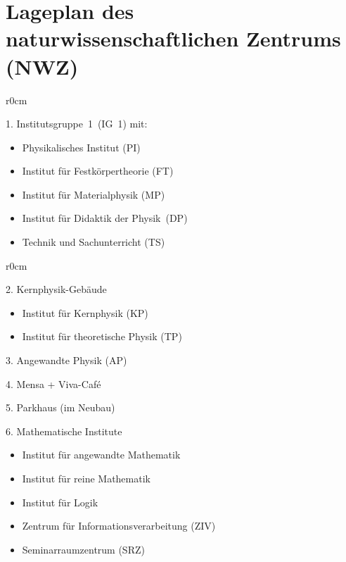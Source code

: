 
\section{Lageplan des naturwissenschaftlichen Zentrums (NWZ)}

\vspace{3\baselineskip}

{\large
\begin{wrapfigure}{r}{0cm}
	\centering
\end{wrapfigure}
1. Institutsgruppe~1~(IG~1) mit:
\begin{itemize}
	\item Physikalisches Institut (PI)
	\item Institut für Festkörpertheorie (FT)
	\item Institut für Materialphysik (MP)
	\item Institut für Didaktik der Physik~(DP)
	\item Technik und Sachunterricht (TS)
\end{itemize}

\clearpage
	
\begin{wrapfigure}{r}{0cm}
	\centering
\end{wrapfigure}
2. Kernphysik-Gebäude
\begin{itemize}
	\item Institut für Kernphysik (KP)
	\item Institut für theoretische Physik (TP)
\end{itemize}

3. Angewandte Physik (AP)

4. Mensa + Viva-Café

5. Parkhaus (im Neubau)

6. Mathematische Institute
\begin{itemize}
	\item Institut für angewandte Mathematik
	\item Institut für reine Mathematik
	\item Institut für Logik
	\item Zentrum für Informationsverarbeitung (ZIV)
	\item Seminarraumzentrum (SRZ)
\end{itemize}

}
